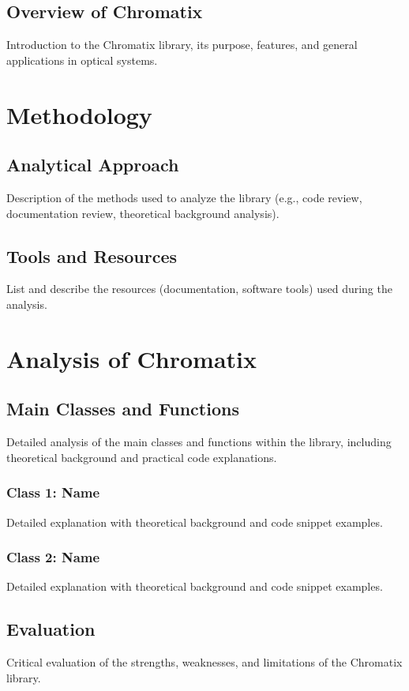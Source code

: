 \documentclass[a4paper,12pt]{report}
\begin{document}
\section{Overview of Chromatix}
Introduction to the Chromatix library, its purpose, features, and general applications in optical systems.

\chapter{Methodology}
\section{Analytical Approach}
Description of the methods used to analyze the library (e.g., code review, documentation review, theoretical background analysis).

\section{Tools and Resources}
List and describe the resources (documentation, software tools) used during the analysis.

\chapter{Analysis of Chromatix}
\section{Main Classes and Functions}
Detailed analysis of the main classes and functions within the library, including theoretical background and practical code explanations.

\subsection{Class 1: Name}
Detailed explanation with theoretical background and code snippet examples.

\subsection{Class 2: Name}
Detailed explanation with theoretical background and code snippet examples.


\section{Evaluation}
Critical evaluation of the strengths, weaknesses, and limitations of the Chromatix library.
\end{document}
